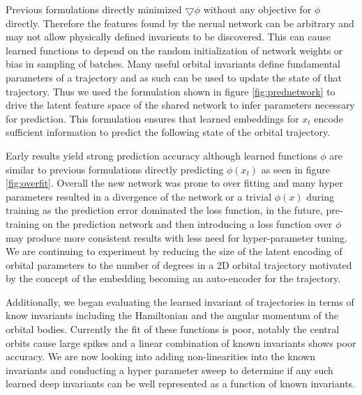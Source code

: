 \documentclass[10pt,letterpaper]{report}
\author{Brandon Houghton}
\begin{document}
Previous formulations directly minimized $\bigtriangledown \phi$ without any objective for $\phi$ directly. Therefore the features found by the nerual network can be arbitrary and may not allow physically defined invarients to be discovered. This can cause learned functions to depend on the random initialization of network weights or bias in sampling of batches. Many useful orbital invariants define fundamental parameters of a trajectory and as such can be used to update the state of that trajectory. Thus we used the formulation shown in figure \ref{fig:prednetwork} to drive the latent feature space of the shared network to infer parameters necessary for prediction. This formulation ensures that learned embeddings for $x_t$ encode sufficient information to predict the following state of the orbital trajectory.

Early results yield strong prediction accuracy although learned functions $\phi$ are similar to previous formulations directly predicting $\phi (x_t)$ as seen in figure \ref{fig:overfit}. Overall the new network was prone to over fitting and many hyper parameters resulted in a divergence of the network or a trivial $\phi(x)$ during training as the prediction error dominated the loss function, in the future, pre-training on the prediction network and then introducing a loss function over $\phi$ may produce more consistent results with less need for hyper-parameter tuning. We are continuing to experiment by reducing the size of the latent encoding of orbital parameters to the number of degrees in a 2D orbital trajectory motivated by the concept of the embedding becoming an auto-encoder for the trajectory.

Additionally, we began evaluating the learned invariant of trajectories in terms of know invariants including the Hamiltonian and the angular momentum of the orbital bodies. Currently the fit of these functions is poor, notably the central orbits cause large spikes and a linear combination of known invariants shows poor accuracy. We are now looking into adding non-linearities into the known invariants and conducting a hyper parameter sweep to determine if any such learned deep invariants can be well represented as a function of known invariants.  
\end{document}

